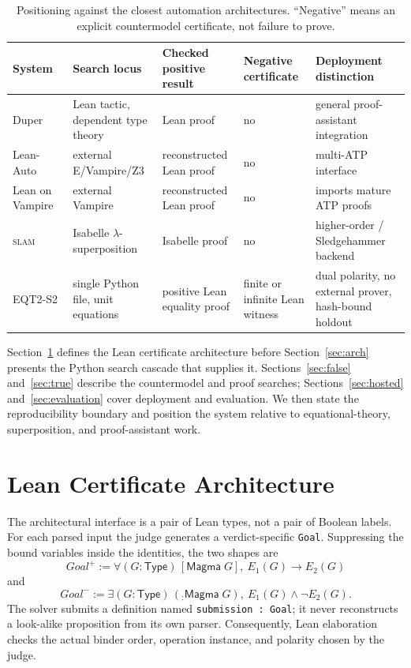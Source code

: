 \documentclass[10pt,twocolumn]{article}
\newcommand{\solver}{\textsc{EQT2-S2}\xspace}
\newcommand{\code}[1]{\texttt{#1}}
\begin{document}
\begin{table}[t]
\caption{Positioning against the closest automation architectures.  ``Negative''
means an explicit countermodel certificate, not failure to prove.}
\label{tab:systems}
\small
\begin{tabularx}{\textwidth}{@{}lYYYY@{}}
\toprule
System & Search locus & Checked positive result & Negative certificate & Deployment distinction \\
\midrule
Duper~\cite{duper} & Lean tactic, dependent type theory & Lean proof & no & general proof-assistant integration \\
Lean-Auto~\cite{leanAuto} & external E/Vampire/Z3 & reconstructed Lean proof & no & multi-ATP interface \\
Lean on Vampire~\cite{leanVampire} & external Vampire & reconstructed Lean proof & no & imports mature ATP proofs \\
\textsc{slam}~\cite{slam} & Isabelle $\lambda$-superposition & Isabelle proof & no & higher-order / Sledgehammer backend \\
\solver & single Python file, unit equations & positive Lean equality proof & finite or infinite Lean witness & dual polarity, no external prover, hash-bound holdout \\
\bottomrule
\end{tabularx}
\end{table}

Section~\ref{sec:certarch} defines the Lean certificate architecture before
Section~\ref{sec:arch} presents the Python search cascade that supplies it.
Sections~\ref{sec:false} and~\ref{sec:true} describe the countermodel and proof
searches; Sections~\ref{sec:hosted} and~\ref{sec:evaluation} cover deployment
and evaluation.  We then state the reproducibility boundary and position the
system relative to equational-theory, superposition, and proof-assistant work.

\section{Lean Certificate Architecture}
\label{sec:certarch}

The architectural interface is a pair of Lean types, not a pair of Boolean
labels.  For each parsed input the judge generates a verdict-specific
\code{Goal}.  Suppressing the bound variables inside the identities, the two
shapes are
\[
  \mathit{Goal}^{+} :=
  \forall (G : \mathsf{Type})\,[\mathsf{Magma}\;G],\ E_1(G)\to E_2(G)
\]
and
\[
  \mathit{Goal}^{-} :=
  \exists (G : \mathsf{Type})\,(_ : \mathsf{Magma}\;G),\
  E_1(G)\mathbin{\land}\neg E_2(G).
\]
The solver submits a definition named \code{submission : Goal}; it never
reconstructs a look-alike proposition from its own parser.  Consequently,
Lean elaboration checks the actual binder order, operation instance, and
polarity chosen by the judge.
\end{document}
